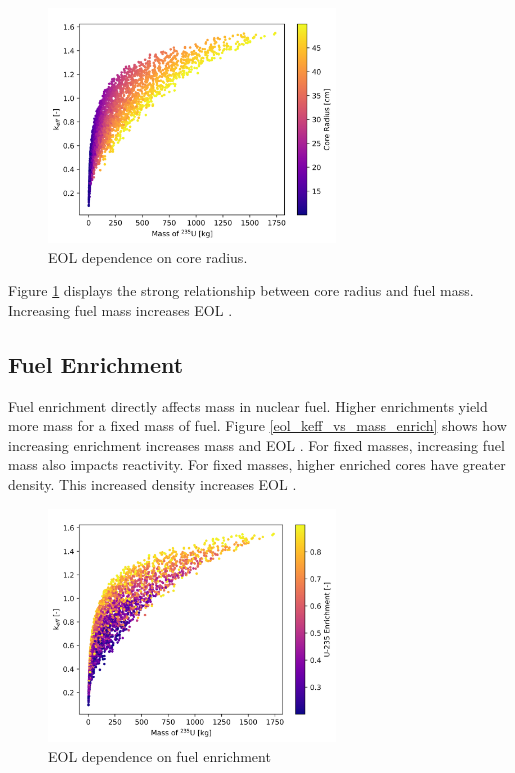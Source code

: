 \begin{figure}[h]
    \centering
    \includegraphics[width=3in]{../images/keff_vs_mass_235_core_r.png}
\caption{EOL \keff dependence on core radius.}
\label{fig:eol_keff_vs_r_core}
\end{figure}

Figure \ref{fig:eol_keff_vs_r_core} displays the strong relationship between
core radius and fuel mass. Increasing fuel mass increases EOL \keff.

\subsection{Fuel Enrichment}
Fuel enrichment directly affects \uran mass in nuclear fuel. Higher enrichments
yield more \uran mass for a fixed mass of fuel. Figure
\ref{eol_keff_vs_mass_enrich} shows how increasing enrichment increases \uran
mass and EOL \keff. For fixed \uran masses, increasing fuel mass also impacts
reactivity. For fixed \uran masses, higher enriched cores have greater \uran
density. This increased density increases EOL \keff.

\begin{figure}[h]
    \centering
    \includegraphics[width=3in]{../images/keff_vs_mass_235_enrich.png}
\caption{EOL \keff dependence on fuel enrichment}
\label{fig:eol_keff_vs_mass_enrich}
\end{figure}

